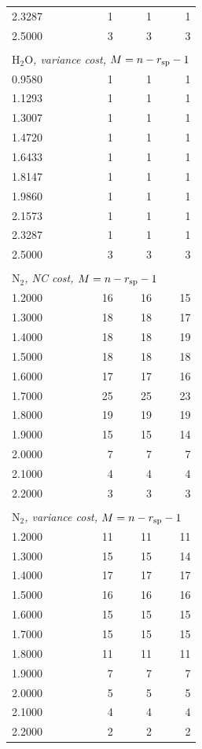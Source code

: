 \begin{longtable}{lrrr}
2.3287 & 1 & 1 & 1\\
2.5000 & 3 & 3 & 3\\
\multicolumn{4}{l}{}\\
\multicolumn{4}{l}{\emph{$\mathrm{H_2O}$, variance cost, $M=n-r_{\mathrm{sp}}-1$}}\\
\hline
0.9580 & 1 & 1 & 1\\
1.1293 & 1 & 1 & 1\\
1.3007 & 1 & 1 & 1\\
1.4720 & 1 & 1 & 1\\
1.6433 & 1 & 1 & 1\\
1.8147 & 1 & 1 & 1\\
1.9860 & 1 & 1 & 1\\
2.1573 & 1 & 1 & 1\\
2.3287 & 1 & 1 & 1\\
2.5000 & 3 & 3 & 3\\
\multicolumn{4}{l}{}\\
\multicolumn{4}{l}{\emph{$\mathrm{N_2}$, NC cost, $M=n-r_{\mathrm{sp}}-1$}}\\
\hline
1.2000 & 16 & 16 & 15\\
1.3000 & 18 & 18 & 17\\
1.4000 & 18 & 18 & 19\\
1.5000 & 18 & 18 & 18\\
1.6000 & 17 & 17 & 16\\
1.7000 & 25 & 25 & 23\\
1.8000 & 19 & 19 & 19\\
1.9000 & 15 & 15 & 14\\
2.0000 & 7 & 7 & 7\\
2.1000 & 4 & 4 & 4\\
2.2000 & 3 & 3 & 3\\
\multicolumn{4}{l}{}\\
\multicolumn{4}{l}{\emph{$\mathrm{N_2}$, variance cost, $M=n-r_{\mathrm{sp}}-1$}}\\
\hline
1.2000 & 11 & 11 & 11\\
1.3000 & 15 & 15 & 14\\
1.4000 & 17 & 17 & 17\\
1.5000 & 16 & 16 & 16\\
1.6000 & 15 & 15 & 15\\
1.7000 & 15 & 15 & 15\\
1.8000 & 11 & 11 & 11\\
1.9000 & 7 & 7 & 7\\
2.0000 & 5 & 5 & 5\\
2.1000 & 4 & 4 & 4\\
2.2000 & 2 & 2 & 2\\
\end{longtable}
